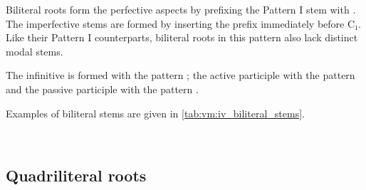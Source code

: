 \documentclass[grammar]{subfiles}
\begin{document}
Biliteral roots form the perfective aspects by prefixing the Pattern I stem
with .  The imperfective stems are formed by inserting the prefix
 immediately before C₁.  Like their Pattern I counterparts, biliteral
roots in this pattern also lack distinct modal stems. 

The infinitive is formed with the pattern ; the active participle
with the pattern  and the passive participle with the pattern
. 

Examples of biliteral stems are given in \cref{tab:vm:iv_biliteral_stems}. 

\begin{table}[h!]\small\capstart
  \centering
  \\
  \caption{Pattern IV biliteral stems \label{tab:vm:iv_biliteral_stems}}
\end{table}
    

\subsection{Quadriliteral roots}
\label{ssec:vm:iv_quadriliteral_roots}
\end{document}
